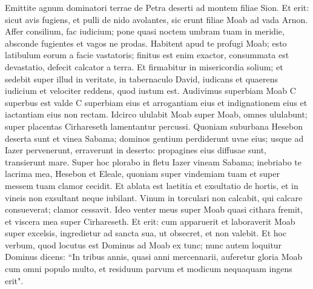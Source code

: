 \begin{biblechapter}  
\verse Emittite agnum dominatori terrae de Petra deserti ad montem filiae Sion. 
\verse Et erit: sicut avis fugiens, et pulli de nido avolantes, sic erunt filiae Moab ad vada Arnon. 
\verse Affer consilium, fac iudicium; pone quasi noctem umbram tuam in meridie, absconde fugientes et vagos ne prodas. 
\verse Habitent apud te profugi Moab; esto latibulum eorum a facie vastatoris; finitus est enim exactor, consummata est devastatio, defecit calcator a terra. 
\verse Et firmabitur in misericordia solium; et sedebit super illud in veritate, in tabernaculo David, iudicans et quaerens iudicium et velociter reddens, quod iustum est. 
\verse Audivimus superbiam Moab C superbus est valde C superbiam eius et arrogantiam eius et indignationem eius et iactantiam eius non rectam. 
\verse Idcirco ululabit Moab super Moab, omnes ululabunt; super placentas Cirhareseth lamentantur percussi. 
\verse Quoniam suburbana Hesebon deserta sunt et vinea Sabama; dominos gentium perdiderunt uvae eius; usque ad Iazer pervenerunt, erraverunt in deserto: propagines eius diffusae sunt, transierunt mare. 
\verse Super hoc plorabo in fletu Iazer vineam Sabama; inebriabo te lacrima mea, Hesebon et Eleale, quoniam super vindemiam tuam et super messem tuam clamor cecidit. 
\verse Et ablata est laetitia et exsultatio de hortis, et in vineis non exsultant neque iubilant. Vinum in torculari non calcabit, qui calcare consueverat; clamor cessavit. 
\verse Ideo venter meus super Moab quasi cithara fremit, et viscera mea super Cirhareseth. 
\verse Et erit: cum apparuerit et laboraverit Moab super excelsis, ingredietur ad sancta sua, ut obsecret, et non valebit. 
\verse Et hoc verbum, quod locutus est Dominus ad Moab ex tunc; 
\verse nunc autem loquitur Dominus dicens: “In tribus annis, quasi anni mercennarii, auferetur gloria Moab cum omni populo multo, et residuum parvum et modicum nequaquam ingens erit". 
\end{biblechapter}


